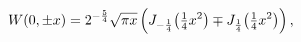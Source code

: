 \[\mathop{W\/}\nolimits\!\left(0,\pm x\right)=2^{-\frac{5}{4}}\sqrt{\pi x}\left(%
\mathop{J_{-\frac{1}{4}}\/}\nolimits\!\left(\tfrac{1}{4}x^{2}\right)\mp\mathop%
{J_{\frac{1}{4}}\/}\nolimits\!\left(\tfrac{1}{4}x^{2}\right)\right),\]